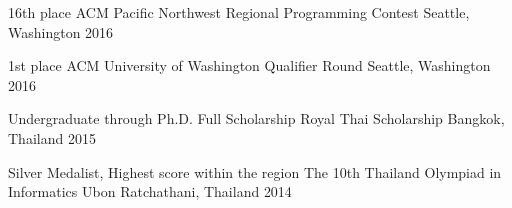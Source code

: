 
\begin{cvhonors}
  \cvhonor
    {16th place} %
    {ACM Pacific Northwest Regional Programming Contest} %
    {Seattle, Washington} %
    {2016} %

  \cvhonor
    {1st place} %
    {ACM University of Washington Qualifier Round} %
    {Seattle, Washington} %
    {2016} %

  \cvhonor
    {Undergraduate through Ph.D. Full Scholarship} %
    {Royal Thai Scholarship} %
    {Bangkok, Thailand} %
    {2015} %

  \cvhonor
    {Silver Medalist, Highest score within the region} %
    {The 10th Thailand Olympiad in Informatics} %
    {Ubon Ratchathani, Thailand} %
    {2014} %


\end{cvhonors}
